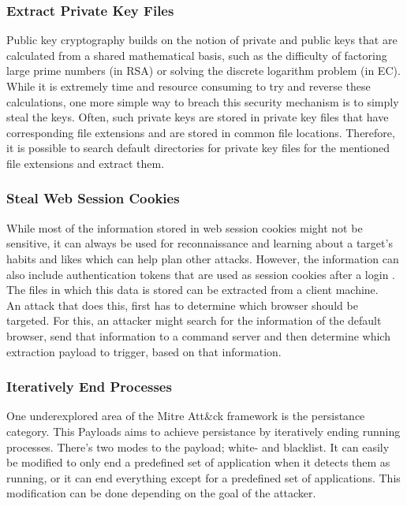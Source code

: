 \subsubsection{Extract Private Key Files}

Public key cryptography builds on the notion of private and public keys that are calculated from a shared mathematical basis, such as the difficulty of factoring large prime numbers (in RSA) or solving the discrete logarithm problem (in EC). While it is extremely time and resource consuming to try and reverse these calculations, one more simple way to breach this security mechanism is to simply steal the keys. Often, such private keys are stored in private key files that have corresponding file extensions and are stored in common file locations. Therefore, it is possible to search default directories for private key files for the mentioned file extensions and extract them.    


\subsubsection{Steal Web Session Cookies}

While most of the information stored in web session cookies might not be sensitive, it can always be used for reconnaissance and learning about a target's habits and likes which can help plan other attacks. However, the information can also include authentication tokens that are used as session cookies after a login \cite{StealWebSession}. The files in which this data is stored can be extracted from a client machine. \\
An attack that does this, first has to determine which browser should be targeted. For this, an attacker might search for the information of the default browser, send that information to a command server and then determine which extraction payload to trigger, based on that information. 


\subsubsection{Iteratively End Processes} \label{Iteratively End Processes}

One underexplored area of the Mitre Att\&ck framework is the persistance category. This Payloads aims to achieve persistance by iteratively ending running processes. There's two modes to the payload; white- and blacklist. It can easily be modified to only end a predefined set of application when it detects them as running, or it can end everything except for a predefined set of applications. This modification can be done depending on the goal of the attacker. 


